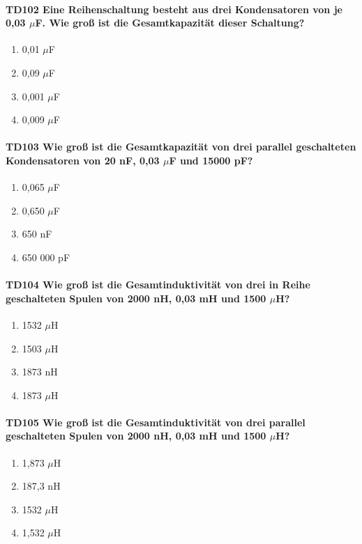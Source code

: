 \documentclass[8pt]{article}
\begin{document}
\begin{enumerate}
\begin{enumerate}[nolistsep,label=\Alph*]
\paragraph*{TD102 Eine Reihenschaltung besteht aus drei Kondensatoren von je 0,03 $\mu$F. Wie groß ist die Gesamtkapazität dieser Schaltung?}
\begin{enumerate}[nolistsep,label=\Alph*]
\item 0,01 $\mu$F
\item 0,09 $\mu$F
\item 0,001 $\mu$F
\item 0,009 $\mu$F
\end{enumerate}

\paragraph*{TD103 Wie groß ist die Gesamtkapazität von drei parallel geschalteten Kondensatoren von 20 nF, 0,03 $\mu$F und 15000 pF?}
\begin{enumerate}[nolistsep,label=\Alph*]
\item 0,065 $\mu$F
\item 0,650 $\mu$F
\item 650 nF
\item 650 000 pF
\end{enumerate}

\paragraph*{TD104 Wie groß ist die Gesamtinduktivität von drei in Reihe geschalteten Spulen von 2000 nH, 0,03 mH und 1500 $\mu$H?}
\begin{enumerate}[nolistsep,label=\Alph*]
\item 1532 $\mu$H
\item 1503 $\mu$H
\item 1873 nH
\item 1873 $\mu$H
\end{enumerate}

\paragraph*{TD105 Wie groß ist die Gesamtinduktivität von drei parallel geschalteten Spulen von 2000 nH, 0,03 mH und 1500 $\mu$H?}
\begin{enumerate}[nolistsep,label=\Alph*]
\item 1,873 $\mu$H
\item 187,3 nH
\item 1532 $\mu$H
\item 1,532 $\mu$H
\end{enumerate}


\end{enumerate}
\end{enumerate}
\end{document}
